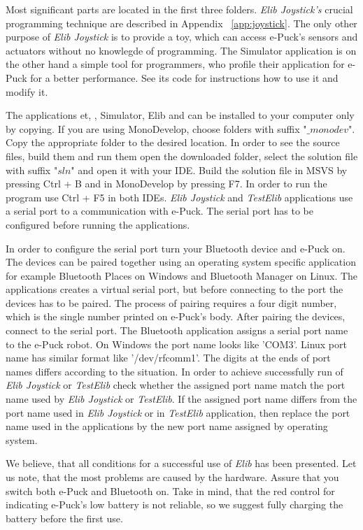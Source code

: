   Most significant parts are located in the first three folders.
  {\it Elib Joystick's} crucial programming technique are described in Appendix ~\ref{app:joystick}.
  The only other purpose of {\it Elib Joystick} is to provide a toy, which can access e-Puck's sensors and actuators without no knowlegde of programming.
  The Simulator application is on the other hand a simple tool for programmers, who profile their application for e-Puck for a better performance.
  See its code for instructions how to use it and modify it.

  The applications {\sf et}, {}, {\sf Simulator}, {\sf Elib} and {}
  can be installed to your computer only by copying.
  If you are using MonoDevelop, choose folders with suffix "$\_monodev$". 
  Copy the appropriate folder to the desired location.
  In order to see the source files, build them and run them open the downloaded folder, select the solution file with suffix "$sln$" and open it with your IDE.
  Build the solution file in MSVS by pressing Ctrl + B and in MonoDevelop by pressing F7. 
  In order to run the program use Ctrl + F5 in both IDEs.
  {\it Elib Joystick} and {\it TestElib} applications use a serial port to a communication with e-Puck. 
  The serial port has to be configured before running the applications.

  In order to configure the serial port turn your Bluetooth device and e-Puck on. 
  The devices can be paired together using an operating system specific application 
  for example Bluetooth Places on Windows and Bluetooth Manager on Linux. 
  The applications creates a virtual serial port, but before connecting to the port
  the devices has to be paired.
  The process of pairing requires a four digit number, 
  which is the single number printed on e-Puck's body.
  After pairing the devices, connect to the serial port.
  The Bluetooth application assigns a serial port name to the e-Puck robot. 
  On Windows the port name looks like 'COM3'. 
  Linux port name has similar format like '/dev/rfcomm1'.
  The digits at the ends of port names differs according to the situation.
  In order to achieve successfully run of {\it Elib Joystick} or {\it TestElib} check
  whether the assigned port name match the port name used by {\it Elib Joystick} or {\it TestElib}.
  If the assigned port name differs from the port name used in {\it Elib Joystick}
  or in {\it TestElib} application, then replace the port name used in the applications by
  the new port name assigned by operating system.

  We believe, that all conditions for a successful use  of {\it Elib} has been presented. 
  Let us note, that the most problems are caused by the hardware.
  Assure that you switch both e-Puck and Bluetooth on. Take in mind, 
  that the red control for indicating e-Puck's low battery is not reliable,
  so we suggest fully charging the battery before the first use.


